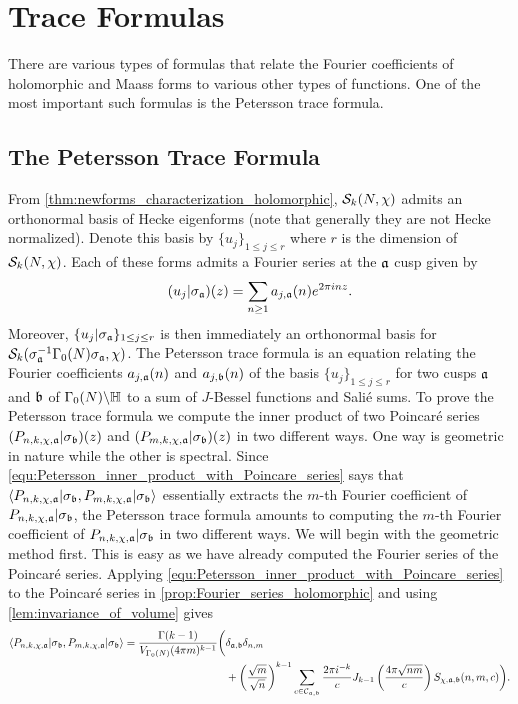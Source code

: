\chapter{Trace Formulas}
  There are various types of formulas that relate the Fourier coefficients of holomorphic and Maass forms to various other types of functions. One of the most important such formulas is the Petersson trace formula.
  \section{The Petersson Trace Formula}
    From \cref{thm:newforms_characterization_holomorphic}, $\mathcal{S}_{k}(N,\chi)$ admits an orthonormal basis of Hecke eigenforms (note that generally they are not Hecke normalized). Denote this basis by $\{u_{j}\}_{1 \le j \le r}$ where $r$ is the dimension of $\mathcal{S}_{k}(N,\chi)$. Each of these forms admits a Fourier series at the $\mathfrak{a}$ cusp given by
    \[
      (u_{j}|\sigma_{\mathfrak{a}})(z) = \sum_{n \ge 1}a_{j,\mathfrak{a}}(n)e^{2\pi inz}.
    \]
    Moreover, $\{u_{j}|\sigma_{\mathfrak{a}}\}_{1 \le j \le r}$ is then immediately an orthonormal basis for $\mathcal{S}_{k}(\sigma_{\mathfrak{a}}^{-1}\Gamma_{0}(N)\sigma_{\mathfrak{a}},\chi)$.
    The Petersson trace formula is an equation relating the Fourier coefficients $a_{j,\mathfrak{a}}(n)$ and $a_{j,\mathfrak{b}}(n)$ of the basis $\{u_{j}\}_{1 \le j \le r}$ for two cusps $\mathfrak{a}$ and $\mathfrak{b}$ of $\Gamma_{0}(N)\backslash\mathbb{H}$ to a sum of $J$-Bessel functions and Sali\'e sums. To prove the Petersson trace formula we compute the inner product of two Poincar\'e series $(P_{n,k,\chi,\mathfrak{a}}|\sigma_{\mathfrak{b}})(z)$ and $(P_{m,k,\chi,\mathfrak{a}}|\sigma_{\mathfrak{b}})(z)$ in two different ways. One way is geometric in nature while the other is spectral. Since \cref{equ:Petersson_inner_product_with_Poincare_series} says that $\langle P_{n,k,\chi,\mathfrak{a}}|\sigma_{\mathfrak{b}},P_{m,k,\chi,\mathfrak{a}}|\sigma_{\mathfrak{b}}\rangle$ essentially extracts the $m$-th Fourier coefficient of $P_{n,k,\chi,\mathfrak{a}}|\sigma_{\mathfrak{b}}$, the Petersson trace formula amounts to computing the $m$-th Fourier coefficient of $P_{n,k,\chi,\mathfrak{a}}|\sigma_{\mathfrak{b}}$ in two different ways. We will begin with the geometric method first. This is easy as we have already computed the Fourier series of the Poincar\'e series. Applying \cref{equ:Petersson_inner_product_with_Poincare_series} to the Poincar\'e series in \cref{prop:Fourier_series_holomorphic} and using \cref{lem:invariance_of_volume} gives
    \begin{align*}
      \langle P_{n,k,\chi,\mathfrak{a}}|\sigma_{\mathfrak{b}},P_{m,k,\chi,\mathfrak{a}}|\sigma_{\mathfrak{b}}\rangle = \frac{\Gamma(k-1)}{V_{\Gamma_{0}(N)}(4\pi m)^{k-1}}\bigg(&\delta_{\mathfrak{a},\mathfrak{b}}\delta_{n,m} \\
      &+\left(\frac{\sqrt{m}}{\sqrt{n}}\right)^{k-1}\sum_{c \in \mathcal{C}_{\mathfrak{a},\mathfrak{b}}}\frac{2\pi i^{-k}}{c}J_{k-1}\left(\frac{4\pi\sqrt{nm}}{c}\right)S_{\chi,\mathfrak{a},\mathfrak{b}}(n,m,c)\bigg).
    \end{align*}
